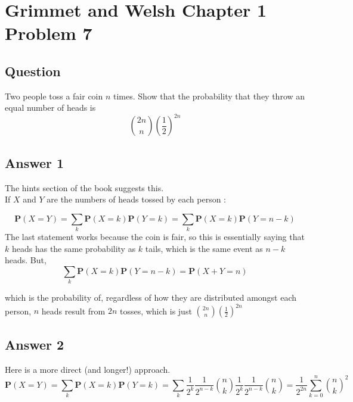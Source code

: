 \section{Grimmet and Welsh Chapter 1 Problem 7}
\subsection{Question}

Two people toss a fair coin $n$ times. Show that the probability that they throw an equal number of heads is 
\begin{equation*} 
\binom{2n}{n}\left(\frac{1}{2}\right)^{2n}
\end{equation*} 

\subsection{Answer 1}
The hints section of the book suggests this.\\
If $X$ and $Y$ are the numbers of heads tossed by each person :

\begin{equation*} 
\mathbf{P}(X = Y) = \sum_k \mathbf{P}(X = k)\mathbf{P}(Y = k) =  \sum_k \mathbf{P}(X = k)\mathbf{P}(Y = n - k)  
\end{equation*}
The last statement works because the coin is fair, so this is essentially saying that $k$ heads has the same probability as $k$ tails, which is the same event as $n - k$ heads. 
But,
\begin{equation*} 
\sum_k \mathbf{P}(X = k)\mathbf{P}(Y = n - k) =   \mathbf{P}(X + Y = n)
\end{equation*}

which is the probability of, regardless of how they are distributed amongst each person, $n$ heads result from $2n$ tosses, which is just  $\binom{2n}{n}\left(\frac{1}{2}\right)^{2n}$

\subsection{Answer 2}
Here is a more direct (and longer!) approach.
\begin{equation*} 
\mathbf{P}(X = Y) = \sum_k \mathbf{P}(X = k)\mathbf{P}(Y = k) = 
 \sum_k \frac{1}{2^k}\frac{1}{2^{n-k}} \binom{n}{k} \frac{1}{2^k}\frac{1}{2^{n-k}} \binom{n}{k} 
  = \frac{1}{2^{2n}}\sum_{k=0}^n \binom{n}{k}^2
\end{equation*}

